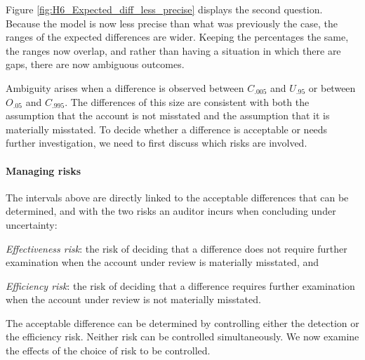 \documentclass[12pt,a4paper]{memoir}
\begin{document}
Figure \ref{fig:H6_Expected_diff_less_precise} displays the second question. Because the model is now less precise than what was previously the case, the ranges of the expected differences are wider. Keeping the percentages the same, the ranges now overlap, and rather than having a situation in which there are gaps, there are now ambiguous outcomes.

Ambiguity arises when a difference is observed between $C_{.005}$ and $U_{.95}$ or between $O_{.05}$ and $C_{.995}$. The differences of this size are consistent with both the assumption that the account is not misstated and the assumption that it is materially misstated. To decide whether a difference is acceptable or needs further investigation, we need to first discuss which risks are involved. 

\paragraph{Managing risks} The intervals above are directly linked to the acceptable differences that can be determined, and with the two risks an auditor incurs when concluding under uncertainty:

\begin{compactitem}
\item \textit{Effectiveness risk}: the risk of deciding that a difference does not require further examination when the account under review is materially misstated, and 
\item \textit{Efficiency risk}: the risk of deciding that a difference requires further examination when the account under review is not materially misstated.
\end{compactitem}

\bigskip
The acceptable difference can be determined by controlling either the detection or the efficiency risk. Neither risk can be controlled simultaneously. We now examine the effects of the choice of risk to be controlled.
\end{document}
